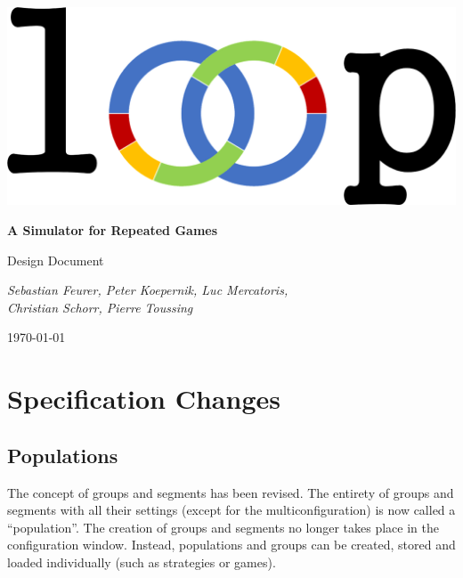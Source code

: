 \documentclass[parskip=full,11pt]{scrartcl}
\begin{document}
\begin{titlepage}
	\centering
	\vspace*{5cm}
	\includegraphics[width = 0.7\linewidth]{images/Logos/loop.png}\par
	{\huge\bfseries A Simulator for Repeated Games\par}
	{\Large Design Document\par}
	\vspace{2cm}
	{\Large\itshape Sebastian Feurer, Peter Koepernik, Luc Mercatoris,\\Christian Schorr, Pierre Toussing\par}
	\vfill
	{\large \today\par}
\end{titlepage}

\tableofcontents
\pagebreak

\section{Specification Changes}

\subsection{Populations}
The concept of groups and segments has been revised. The entirety of groups and segments with all their settings (except for the multiconfiguration) is now called a \enquote{population}. The creation of groups and segments no longer takes place in the configuration window. Instead, populations and groups can be created, stored and loaded individually (such as strategies or games).
\end{document}
